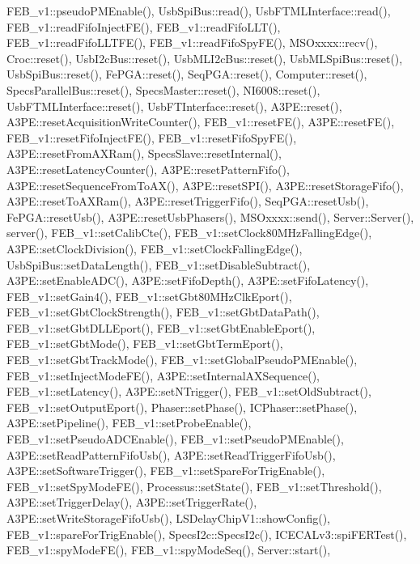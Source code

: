 F\+E\+B\+\_\+v1\+::pseudo\+P\+M\+Enable(), Usb\+Spi\+Bus\+::read(), Usb\+F\+T\+M\+L\+Interface\+::read(), F\+E\+B\+\_\+v1\+::read\+Fifo\+Inject\+F\+E(), F\+E\+B\+\_\+v1\+::read\+Fifo\+L\+L\+T(), F\+E\+B\+\_\+v1\+::read\+Fifo\+L\+L\+T\+F\+E(), F\+E\+B\+\_\+v1\+::read\+Fifo\+Spy\+F\+E(), M\+S\+Oxxxx\+::recv(), Croc\+::reset(), Usb\+I2c\+Bus\+::reset(), Usb\+M\+L\+I2c\+Bus\+::reset(), Usb\+M\+L\+Spi\+Bus\+::reset(), Usb\+Spi\+Bus\+::reset(), Fe\+P\+G\+A\+::reset(), Seq\+P\+G\+A\+::reset(), Computer\+::reset(), Specs\+Parallel\+Bus\+::reset(), Specs\+Master\+::reset(), N\+I6008\+::reset(), Usb\+F\+T\+M\+L\+Interface\+::reset(), Usb\+F\+T\+Interface\+::reset(), A3\+P\+E\+::reset(), A3\+P\+E\+::reset\+Acquisition\+Write\+Counter(), F\+E\+B\+\_\+v1\+::reset\+F\+E(), A3\+P\+E\+::reset\+F\+E(), F\+E\+B\+\_\+v1\+::reset\+Fifo\+Inject\+F\+E(), F\+E\+B\+\_\+v1\+::reset\+Fifo\+Spy\+F\+E(), A3\+P\+E\+::reset\+From\+A\+X\+Ram(), Specs\+Slave\+::reset\+Internal(), A3\+P\+E\+::reset\+Latency\+Counter(), A3\+P\+E\+::reset\+Pattern\+Fifo(), A3\+P\+E\+::reset\+Sequence\+From\+To\+A\+X(), A3\+P\+E\+::reset\+S\+P\+I(), A3\+P\+E\+::reset\+Storage\+Fifo(), A3\+P\+E\+::reset\+To\+A\+X\+Ram(), A3\+P\+E\+::reset\+Trigger\+Fifo(), Seq\+P\+G\+A\+::reset\+Usb(), Fe\+P\+G\+A\+::reset\+Usb(), A3\+P\+E\+::reset\+Usb\+Phasers(), M\+S\+Oxxxx\+::send(), Server\+::\+Server(), server(), F\+E\+B\+\_\+v1\+::set\+Calib\+Cte(), F\+E\+B\+\_\+v1\+::set\+Clock80\+M\+Hz\+Falling\+Edge(), A3\+P\+E\+::set\+Clock\+Division(), F\+E\+B\+\_\+v1\+::set\+Clock\+Falling\+Edge(), Usb\+Spi\+Bus\+::set\+Data\+Length(), F\+E\+B\+\_\+v1\+::set\+Disable\+Subtract(), A3\+P\+E\+::set\+Enable\+A\+D\+C(), A3\+P\+E\+::set\+Fifo\+Depth(), A3\+P\+E\+::set\+Fifo\+Latency(), F\+E\+B\+\_\+v1\+::set\+Gain4(), F\+E\+B\+\_\+v1\+::set\+Gbt80\+M\+Hz\+Clk\+Eport(), F\+E\+B\+\_\+v1\+::set\+Gbt\+Clock\+Strength(), F\+E\+B\+\_\+v1\+::set\+Gbt\+Data\+Path(), F\+E\+B\+\_\+v1\+::set\+Gbt\+D\+L\+L\+Eport(), F\+E\+B\+\_\+v1\+::set\+Gbt\+Enable\+Eport(), F\+E\+B\+\_\+v1\+::set\+Gbt\+Mode(), F\+E\+B\+\_\+v1\+::set\+Gbt\+Term\+Eport(), F\+E\+B\+\_\+v1\+::set\+Gbt\+Track\+Mode(), F\+E\+B\+\_\+v1\+::set\+Global\+Pseudo\+P\+M\+Enable(), F\+E\+B\+\_\+v1\+::set\+Inject\+Mode\+F\+E(), A3\+P\+E\+::set\+Internal\+A\+X\+Sequence(), F\+E\+B\+\_\+v1\+::set\+Latency(), A3\+P\+E\+::set\+N\+Trigger(), F\+E\+B\+\_\+v1\+::set\+Old\+Subtract(), F\+E\+B\+\_\+v1\+::set\+Output\+Eport(), Phaser\+::set\+Phase(), I\+C\+Phaser\+::set\+Phase(), A3\+P\+E\+::set\+Pipeline(), F\+E\+B\+\_\+v1\+::set\+Probe\+Enable(), F\+E\+B\+\_\+v1\+::set\+Pseudo\+A\+D\+C\+Enable(), F\+E\+B\+\_\+v1\+::set\+Pseudo\+P\+M\+Enable(), A3\+P\+E\+::set\+Read\+Pattern\+Fifo\+Usb(), A3\+P\+E\+::set\+Read\+Trigger\+Fifo\+Usb(), A3\+P\+E\+::set\+Software\+Trigger(), F\+E\+B\+\_\+v1\+::set\+Spare\+For\+Trig\+Enable(), F\+E\+B\+\_\+v1\+::set\+Spy\+Mode\+F\+E(), Processus\+::set\+State(), F\+E\+B\+\_\+v1\+::set\+Threshold(), A3\+P\+E\+::set\+Trigger\+Delay(), A3\+P\+E\+::set\+Trigger\+Rate(), A3\+P\+E\+::set\+Write\+Storage\+Fifo\+Usb(), L\+S\+Delay\+Chip\+V1\+::show\+Config(), F\+E\+B\+\_\+v1\+::spare\+For\+Trig\+Enable(), Specs\+I2c\+::\+Specs\+I2c(), I\+C\+E\+C\+A\+Lv3\+::spi\+F\+E\+R\+Test(), F\+E\+B\+\_\+v1\+::spy\+Mode\+F\+E(), F\+E\+B\+\_\+v1\+::spy\+Mode\+Seq(), Server\+::start(), 